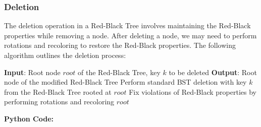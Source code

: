 \documentclass[12pt]{book} %
\begin{document}
\subsubsection{Deletion}
The deletion operation in a Red-Black Tree involves maintaining the Red-Black properties while removing a node. After deleting a node, we may need to perform rotations and recoloring to restore the Red-Black properties. The following algorithm outlines the deletion process:
\FloatBarrier
\begin{algorithm}
\caption{Deletion in Red-Black Tree}
\begin{algorithmic}[1]
\State \textbf{Input}: Root node \(root\) of the Red-Black Tree, key \(k\) to be deleted
\State \textbf{Output}: Root node of the modified Red-Black Tree
    \State Perform standard BST deletion with key \(k\) from the Red-Black Tree rooted at \(root\)
    \State Fix violations of Red-Black properties by performing rotations and recoloring
    \Return \(root\)
\EndFunction
\end{algorithmic}
\end{algorithm}
\FloatBarrier
\textbf{Python Code:}
\FloatBarrier
\end{document}

